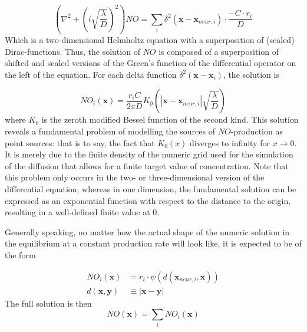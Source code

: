 \documentclass[10pt,a4paper]{article}
\begin{document}
\begin{equation}
\left(\nabla^2 + \left( i\sqrt{\frac{\lambda}{D}}\right)^2\right) NO = \sum_{i} \delta^2(\mathbf{x}-\mathbf{x}_{neur,i})\cdot \frac{- C \cdot r_i}{D}
\label{simple_NO_dyn_with_diff_equil_helmholtz}
\end{equation}
Which is a two-dimensional Helmholtz equation with a superposition of (scaled) Dirac-functions. Thus, the solution of $NO$ is composed of a superposition of shifted and scaled versions of the Green's function of the differential operator on the left of the equation. For each delta function $\delta^2(\mathbf{x}-\mathbf{x}_i)$, the solution is

\begin{equation}
NO_i(\mathbf{x}) = \frac{r_i C}{2 \pi D} K_0 \left(|\mathbf{x}-\mathbf{x}_{neur,i}|\sqrt{\frac{\lambda}{D}} \right)
\label{solution_diff_equil_bessel}
\end{equation}
where $K_0$ is the zeroth modified Bessel function of the second kind. This solution reveals a fundamental problem of modelling the sources of $NO$-production as point sources: that is to say, the fact that $K_0(x)$ diverges to infinity for $x\rightarrow 0$. It is merely due to the finite density of the numeric grid used for the simulation of the diffusion that allows for a finite target value of concentration. Note that this problem only occurs in the two- or three-dimensional version of the differential equation, whereas in one dimension, the fundamental solution can be expressed as an exponential function with respect to the distance to the origin, resulting in a well-defined finite value at $0$.

Generally speaking, no matter how the actual shape of the numeric solution in the equilibrium at a constant production rate will look like, it is expected to be of the form

\begin{align}
NO_i(\mathbf{x}) &= r_i \cdot \psi (d(\mathbf{x}_{neur,i},\mathbf{x})) \label{general_diff_interaction} \\
d(\mathbf{x},\mathbf{y}) &\equiv |\mathbf{x}-\mathbf{y}| \label{eucl_dist}
\end{align}
The full solution is then
\begin{equation}
NO(\mathbf{x}) = \sum_i NO_i(\mathbf{x})
\label{full_sol_diff_equil}
\end{equation}
\end{document}
